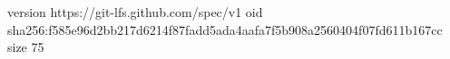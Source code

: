 version https://git-lfs.github.com/spec/v1
oid sha256:f585e96d2bb217d6214f87fadd5ada4aafa7f5b908a2560404f07fd611b167cc
size 75
